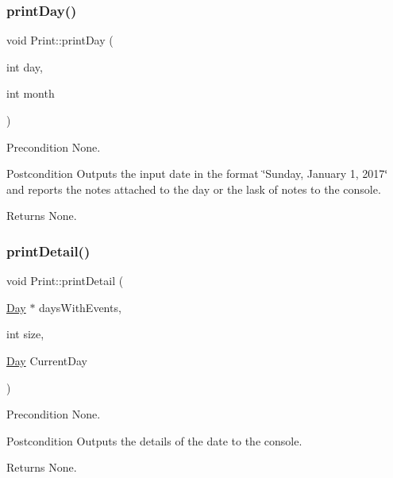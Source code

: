 \subsubsection{\texorpdfstring{print\+Day()}{printDay()}}
{\footnotesize\ttfamily void Print\+::print\+Day (\begin{DoxyParamCaption}\item[{int}]{day,  }\item[{int}]{month }\end{DoxyParamCaption})}

\begin{DoxyPrecond}{Precondition}
None. 
\end{DoxyPrecond}
\begin{DoxyPostcond}{Postcondition}
Outputs the input date in the format \char`\"{}\+Sunday, January 1, 2017\char`\"{} and reports the notes attached to the day or the lask of notes to the console. 
\end{DoxyPostcond}
\begin{DoxyReturn}{Returns}
None. 
\end{DoxyReturn}
\hypertarget{class_print_a41b9f876be13879f8d0b76607ee09297}{}\label{class_print_a41b9f876be13879f8d0b76607ee09297} 
\subsubsection{\texorpdfstring{print\+Detail()}{printDetail()}}
{\footnotesize\ttfamily void Print\+::print\+Detail (\begin{DoxyParamCaption}\item[{\hyperlink{class_day}{Day} $\ast$}]{days\+With\+Events,  }\item[{int}]{size,  }\item[{\hyperlink{class_day}{Day}}]{Current\+Day }\end{DoxyParamCaption})}

\begin{DoxyPrecond}{Precondition}
None. 
\end{DoxyPrecond}
\begin{DoxyPostcond}{Postcondition}
Outputs the details of the date to the console. 
\end{DoxyPostcond}
\begin{DoxyReturn}{Returns}
None. 
\end{DoxyReturn}
\hypertarget{class_print_a783042d8e22a1b8a0b81bbcbc9bb03f0}{}\label{class_print_a783042d8e22a1b8a0b81bbcbc9bb03f0} 
